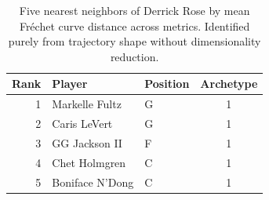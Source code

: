 \begin{table}[htbp]
  \centering\small
  \begin{tabular}{rllc}
    \toprule
    Rank & Player & Position & Archetype \\
    \midrule
    1 & Markelle Fultz & G & 1 \\
    2 & Caris LeVert & G & 1 \\
    3 & GG Jackson II & F & 1 \\
    4 & Chet Holmgren & C & 1 \\
    5 & Boniface N'Dong & C & 1 \\
    \bottomrule
  \end{tabular}
  \caption{Five nearest neighbors of Derrick Rose by mean Fr\'{e}chet curve distance across metrics. Identified purely from trajectory shape without dimensionality reduction.}
  \label{tab:Derrick_Rose_frechet_curve_neighbors}
\end{table}

